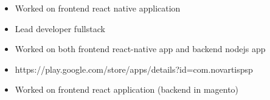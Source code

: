 \documentclass[10pt,a4paper,ragged2e]{altacv}
\begin{document}
\begin{itemize}
\item Worked on frontend react native application
\item Lead developer fullstack
\end{itemize}
\smallskip
\smallskip 


\begin{itemize}
\item Worked on both frontend react-native app and backend nodejs app
\item https://play.google.com/store/apps/details?id=com.novartispsp
\end{itemize}
\smallskip
\smallskip 


\begin{itemize}
\item Worked on frontend react application (backend in magento)
\end{itemize}
\smallskip
\smallskip 




\cvproject{}







\end{document}
